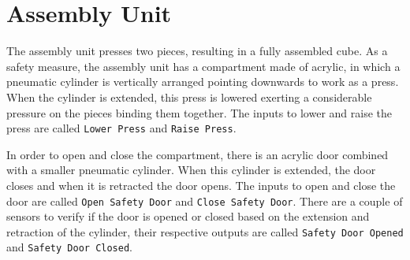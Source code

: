 \section{Assembly Unit}
\label{sec:assemblyUnit}
The assembly unit presses two pieces, resulting in a fully assembled
cube. As a safety measure, the assembly unit has a compartment made of
acrylic, in which a pneumatic cylinder is vertically arranged pointing downwards
to work as a press.
When the cylinder is extended, this press is lowered exerting a considerable
pressure on the pieces binding them together.
The inputs to lower and raise the press are called \verb|Lower Press| and
\verb|Raise Press|.

In order to open and close the compartment, there is an acrylic door combined
with a smaller pneumatic cylinder. When this cylinder is extended, the door
closes and when it is retracted the door opens. The inputs to open and close the
door are called \verb|Open Safety Door| and
\verb|Close Safety Door|. There are a couple of sensors to verify if the door is
opened or closed based on the extension and retraction of the cylinder, their
respective outputs are called \verb|Safety Door Opened| and
\verb|Safety Door Closed|.

